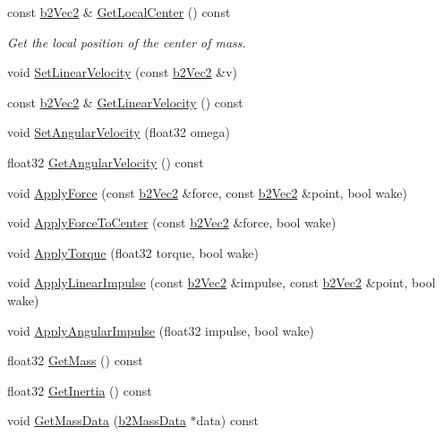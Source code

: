 \begin{DoxyCompactItemize}
\mbox{\label{classb2Body_a60cc46fc46849b0d5e61a151b7c41269}} 
const \hyperlink{structb2Vec2}{b2\+Vec2} \& \hyperlink{classb2Body_a60cc46fc46849b0d5e61a151b7c41269}{Get\+Local\+Center} () const
\begin{DoxyCompactList}\small\item\em Get the local position of the center of mass. \end{DoxyCompactList}\item 
void \hyperlink{classb2Body_a832f3989a44f0d4782c80456832197ad}{Set\+Linear\+Velocity} (const \hyperlink{structb2Vec2}{b2\+Vec2} \&v)
\item 
const \hyperlink{structb2Vec2}{b2\+Vec2} \& \hyperlink{classb2Body_a8fcaf842141320701057f679dff90b89}{Get\+Linear\+Velocity} () const
\item 
void \hyperlink{classb2Body_a37adc4160b84f73e8552a91cbde3f578}{Set\+Angular\+Velocity} (float32 omega)
\item 
float32 \hyperlink{classb2Body_a6a404d85efc510f43575f61cb95c07a7}{Get\+Angular\+Velocity} () const
\item 
void \hyperlink{classb2Body_a942be8e1cd2bcd06f53c4638c45a9525}{Apply\+Force} (const \hyperlink{structb2Vec2}{b2\+Vec2} \&force, const \hyperlink{structb2Vec2}{b2\+Vec2} \&point, bool wake)
\item 
void \hyperlink{classb2Body_abeba04911f7a2a141169bb06fe98d06a}{Apply\+Force\+To\+Center} (const \hyperlink{structb2Vec2}{b2\+Vec2} \&force, bool wake)
\item 
void \hyperlink{classb2Body_a54a354447ac3b4cc224c8327a5abc0e8}{Apply\+Torque} (float32 torque, bool wake)
\item 
void \hyperlink{classb2Body_a7f677e93efb3c4c065087aff317274a3}{Apply\+Linear\+Impulse} (const \hyperlink{structb2Vec2}{b2\+Vec2} \&impulse, const \hyperlink{structb2Vec2}{b2\+Vec2} \&point, bool wake)
\item 
void \hyperlink{classb2Body_a65384cfad8db2376cdf3fab38cac06e5}{Apply\+Angular\+Impulse} (float32 impulse, bool wake)
\item 
float32 \hyperlink{classb2Body_adfeebf45965d131894f728a2f264311d}{Get\+Mass} () const
\item 
float32 \hyperlink{classb2Body_a60929c13e4b6548492dca5ec79f159db}{Get\+Inertia} () const
\item 
void \hyperlink{classb2Body_a5100927dbd39dd0addea79d5f323f3f1}{Get\+Mass\+Data} (\hyperlink{structb2MassData}{b2\+Mass\+Data} $\ast$data) const
\item 

\end{DoxyCompactItemize}
